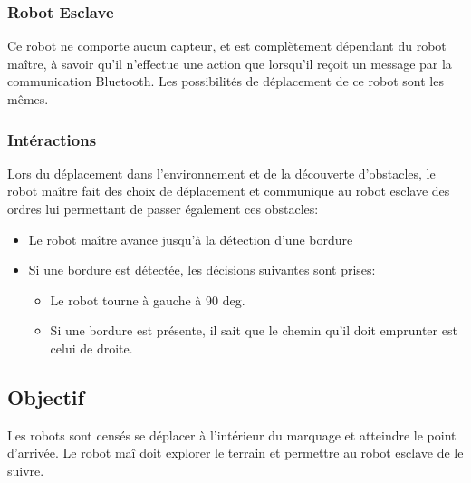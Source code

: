    \subsubsection{Robot Esclave}
   Ce robot ne comporte aucun capteur, et est compl\`{e}tement d\'{e}pendant du
   robot ma\^{i}tre, \`{a} savoir qu'il n'effectue une action que lorsqu'il
   re\c coit un message par la communication Bluetooth. Les possibilit\'{e}s de
   d\'{e}placement de ce robot sont les m\^{e}mes.

   \subsubsection{Int\'{e}ractions}
   Lors du d\'{e}placement dans l'environnement et de la d\'{e}couverte
   d'obstacles, le robot ma\^{i}tre fait des choix de d\'{e}placement et
   communique au robot esclave des ordres lui permettant de passer
   \'{e}galement ces obstacles:
   \begin{itemize}
    \item Le robot ma\^{i}tre avance jusqu'\`{a} la d\'{e}tection d'une bordure
    \item Si une bordure est d\'{e}tect\'{e}e, les d\'{e}cisions suivantes sont
	  prises:
    \begin{itemize}
     \item Le robot tourne \`{a} gauche \`{a} 90 deg.
     \item Si une bordure est pr\'{e}sente, il sait que le chemin qu'il doit
	   emprunter est celui de droite.
    \end{itemize}
   \end{itemize}

  \subsection{Objectif}
  Les robots sont cens\'{e}s se d\'{e}placer \`{a} l'int\'{e}rieur du marquage et
  atteindre le point d'arriv\'{e}e. Le robot ma\^{i} doit explorer le terrain
  et permettre au robot esclave de le suivre. 
